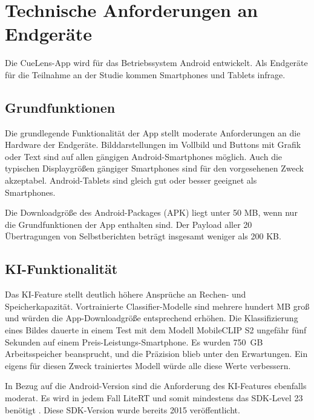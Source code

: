 
\chapter{Technische Anforderungen an Endgeräte}
Die CueLens-App wird für das Betriebssystem Android entwickelt. Als Endgeräte für die Teilnahme an der Studie kommen Smartphones und Tablets infrage.

\section{Grundfunktionen}
Die grundlegende Funktionalität der App stellt moderate Anforderungen an die Hardware der Endgeräte. Bilddarstellungen im Vollbild und Buttons mit Grafik oder Text sind auf allen gängigen Android-Smartphones möglich. Auch die typischen Displaygrößen gängiger Smartphones sind für den vorgesehenen Zweck akzeptabel. Android-Tablets sind gleich gut oder besser geeignet als Smartphones.

Die Downloadgröße des Android-Packages (APK) liegt unter 50 MB, wenn nur die Grundfunktionen der App enthalten sind. Der Payload aller 20 Übertragungen von Selbstberichten beträgt insgesamt weniger als 200 KB.

\section{KI-Funktionalität}
Das KI-Feature stellt deutlich höhere Ansprüche an Rechen- und Speicherkapazität. Vortrainierte Classifier-Modelle sind mehrere hundert MB groß und würden die App-Downloadgröße entsprechend erhöhen. Die Klassifizierung eines Bildes dauerte in einem Test mit dem Modell MobileCLIP S2 ungefähr fünf Sekunden auf einem Preis-Leistungs-Smartphone. Es wurden 750~GB Arbeitsspeicher beansprucht, und die Präzision blieb unter den Erwartungen. Ein eigens für diesen Zweck trainiertes Modell würde alle diese Werte verbessern.

In Bezug auf die Android-Version sind die Anforderung des KI-Features ebenfalls moderat. Es wird in jedem Fall LiteRT und somit mindestens das SDK-Level 23 benötigt \cite{google_litert_android_2026}. Diese SDK-Version wurde bereits 2015 veröffentlicht.

